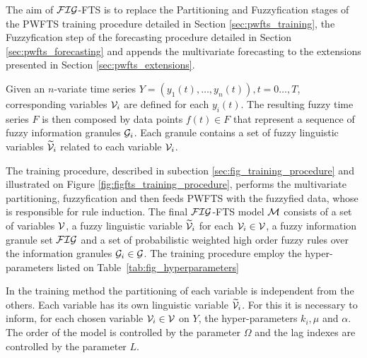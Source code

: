 The aim of $\mathcal{FIG}$-FTS is to replace the Partitioning and Fuzzyfication stages of the PWFTS training procedure detailed in Section \ref{sec:pwfts_training}, the Fuzzyfication step of the forecasting procedure detailed in Section \ref{sec:pwfts_forecasting} and appends the multivariate forecasting to the extensions presented in Section \ref{sec:pwfts_extensions}.

Given an $n$-variate time series $Y=(y_1(t), \ldots,y_n(t)),  t=0\ldots,T$, corresponding variables $\mathcal{V}_i$ are defined for each $y_i(t)$. The resulting fuzzy time series $F$ is then composed by data points $f(t) \in F$ that represent a sequence of fuzzy information granules $\mathcal{G}_i$. Each granule contains a set of fuzzy linguistic variables $\widetilde{\mathcal{V}}_i$ related to each variable $\mathcal{V}_i$.

The training procedure, described in subection \ref{sec:fig_training_procedure} and illustrated on Figure \ref{fig:figfts_training_procedure}, performs the multivariate partitioning, fuzzyfication and then feeds PWFTS with the fuzzyfied data, whose is responsible for rule induction. The final $\mathcal{FIG}$-FTS model $\mathcal{M}$ consists of a set of variables $\mathcal{V}$, a fuzzy linguistic variable $\widetilde{\mathcal{V}}_i$ for each $\mathcal{V}_i \in \mathcal{V}$, a fuzzy information granule set $\mathcal{FIG}$ and a set of probabilistic weighted high order fuzzy rules over the information granules $\mathcal{G}_i \in \mathcal{G}$. The training procedure employ the hyper-parameters listed on Table~\ref{tab:fig_hyperparameters}

In the training method the partitioning of each variable is independent from the others. Each variable has its own linguistic variable $\widetilde{\mathcal{V}}_i$. For this it is necessary to inform, for each chosen variable $\mathcal{V}_i \in \mathcal{V}$ on $Y$, the hyper-parameters $k_i, \mu$ and $\alpha$. The order of the model is controlled by the parameter $\Omega$ and the lag indexes are controlled by the parameter $L$. 

